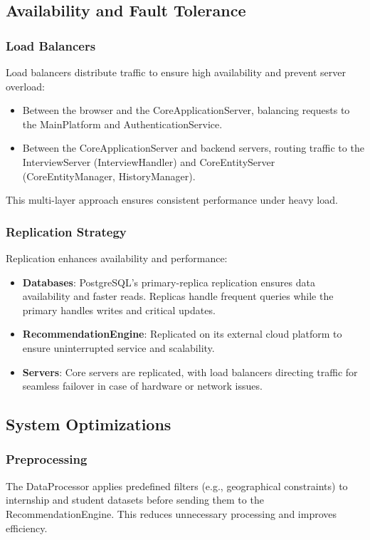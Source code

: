 \subsection{Availability and Fault Tolerance}
\subsubsection{Load Balancers}
Load balancers distribute traffic to ensure high availability and prevent server overload:
\begin{itemize}
    \item Between the browser and the CoreApplicationServer, balancing requests to the MainPlatform and AuthenticationService.
    \item Between the CoreApplicationServer and backend servers, routing traffic to the InterviewServer (InterviewHandler) and CoreEntityServer (CoreEntityManager, HistoryManager).
\end{itemize}
This multi-layer approach ensures consistent performance under heavy load.

\subsubsection{Replication Strategy}
Replication enhances availability and performance:
\begin{itemize}
    \item \textbf{Databases}: PostgreSQL’s primary-replica replication ensures data availability and faster reads. Replicas handle frequent queries while the primary handles writes and critical updates.
    \item \textbf{RecommendationEngine}: Replicated on its external cloud platform to ensure uninterrupted service and scalability.
    \item \textbf{Servers}: Core servers are replicated, with load balancers directing traffic for seamless failover in case of hardware or network issues.
   
\end{itemize}

\subsection{System Optimizations}
\subsubsection{Preprocessing}
The DataProcessor applies predefined filters (e.g., geographical constraints) to internship and student datasets before sending them to the RecommendationEngine. This reduces unnecessary processing and improves efficiency.

